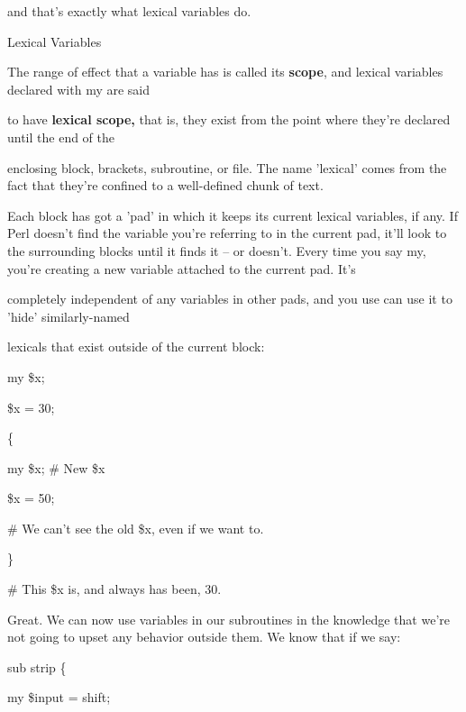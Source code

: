 \documentclass[a4paper,11pt]{book}
\begin{document}
\noindent and that's exactly what lexical variables do.

\noindent 

\noindent 

\noindent Lexical Variables

\noindent 

\noindent The range of effect that a variable has is called its \textbf{scope}, and lexical variables declared with my are said

\noindent to have \textbf{lexical scope, }that is, they exist from the point where they're declared until the end of the

\noindent enclosing block, brackets, subroutine, or file. The name 'lexical' comes from the fact that they're confined to a well-defined chunk of text.

\noindent 

\noindent Each block has got a 'pad' in which it keeps its current lexical variables, if any. If Perl doesn't find the variable you're referring to in the current pad, it'll look to the surrounding blocks until it finds it -- or doesn't. Every time you say my, you're creating a new variable attached to the current pad. It's

\noindent completely independent of any variables in other pads, and you use can use it to 'hide' similarly-named

\noindent lexicals that exist outside of the current block:

\noindent 

\noindent 

\noindent my \$x;

\noindent \$x = 30;

\noindent \{

\noindent my \$x; \# New \$x

\noindent \$x = 50;

\noindent \# We can't see the old \$x, even if we want to.

\noindent \}

\noindent \# This \$x is, and always has been, 30.

\noindent 

\noindent Great. We can now use variables in our subroutines in the knowledge that we're not going to upset any behavior outside them. We know that if we say:

\noindent 

\noindent 

\noindent sub strip \{

\noindent my \$input = shift;
\end{document}
